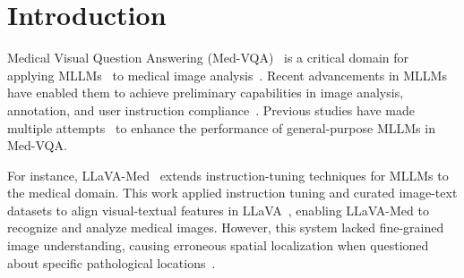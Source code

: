 \section{Introduction}
Medical Visual Question Answering (Med-VQA)~\cite{Lin_2023,Abacha2019VQAMedOO, Hasan2018OverviewOI} is a critical domain for applying MLLMs~\cite{yang2024modelmergingllmsmllms, liang2024comprehensivesurveyguidemultimodal, caffagni-etal-2024-revolution} to medical image analysis~\cite{li2024towards}. Recent advancements in MLLMs have enabled them to achieve preliminary capabilities in image analysis, annotation, and user instruction compliance~\cite{chen2025rllavaimprovingmedvqaunderstanding}. Previous studies have made multiple attempts~\cite{yang2025llmmedqaenhancingmedicalquestion,  kumar2024medvisionllamaleveragingpretrainedlarge, he2024parameterefficientfinetuningmedicalmultimodal,liu2024hcllmhistoricalconstrainedlargelanguage,li2024llava, huang2024BiRD} to enhance the performance of general-purpose MLLMs in Med-VQA. 

For instance, LLaVA-Med~\cite{li2024llava} extends instruction-tuning techniques for MLLMs to the medical domain. This work applied instruction tuning and curated image-text datasets to align visual-textual features in LLaVA~\cite{llava}, enabling LLaVA-Med to recognize and analyze medical images. However, this system lacked fine-grained image understanding, causing erroneous spatial localization when questioned about specific pathological locations~\cite{gai2024enhancing, huang2024BiRD}. 

